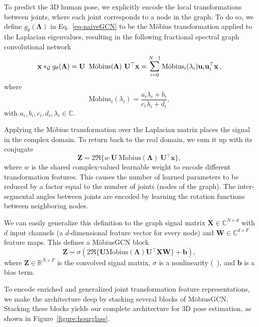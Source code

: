 \documentclass[runningheads]{llncs}
\newcommand{\bigsum}[3]{\mathlarger{\sum}_{#1 = #2}^{#3}}
\renewcommand{\vec}[1]{\ensuremath{\mathbf{#1}}}
\newcommand{\mat}[1]{\ensuremath{\mathbf{#1}}}
\newcommand{\mob}{\ensuremath{\operatorname{M\ddot{o}bius}}}
\newcommand{\graphconv}{\ensuremath{\ast_\mathcal{G}}}
\newcommand{\transpose}{\ensuremath{^\top}}
\begin{document}
To predict the 3D human pose, we explicitly encode the local transformations between joints, where each joint corresponds to a node in the graph. To do so, we define $g_{\theta}(\mat{\Lambda})$ in Eq.~\eqref{eq-naiveGCN} to be the M\"{o}bius transformation applied to the Laplacian eigenvalues, resulting in the following fractional spectral graph convolutional network
\begin{equation}
    \vec{x} \graphconv g_\theta(\mat{\Lambda}) = \mat{U}\  \mob(\mat{\Lambda})\ \mat{U}\transpose\vec{x} = \bigsum{i}{0}{N - 1} \mob_i(\lambda_i)\vec{u}_i\vec{u}_i\transpose\vec{x}\,,
    \label{mobgcn--better-use-of-latex}
\end{equation}
where 
\begin{equation}
\mob_i(\lambda_i) = \frac{a_i\lambda_i+b_i}{c_i\lambda_i+d_i},    
\end{equation}
 with $a_i, b_i, c_i, d_i, \lambda_i \in\mathbb{C}$.

Applying the M\"obius transformation over the Laplacian matrix places the signal in the complex domain. To return back to the real domain, we sum it up with its conjugate
\begin{equation}
    \mat{Z} = 2\Re \{w\ \mat{U}\ \mob (\mat{\Lambda})\ \mat{U}\transpose \vec{x}\},
    \label{realify}
\end{equation}
where $w$ is the shared complex-valued learnable weight to encode different transformation features. This causes the number of learned parameters to be reduced by a factor equal to the number of joints (nodes of the graph). The inter-segmental angles between joints are encoded by learning the rotation functions between neighboring nodes. 

We can easily generalize this definition to the graph signal matrix $\mathbf{X} \in \mathbb{C}^{N\times d}$ with $d$ input channels (\ie a $d$-dimensional feature vector for every node) and $\mathbf{W} \in \mathbb{C}^{d \times F}$ feature maps. 
This defines a M\"obiusGCN block
\begin{equation}
    \mat{Z} = \sigma(2\Re \{\mat{U} \mob(\mat{\Lambda})\mat{U}\transpose\mat{X}\mat{W}\} + \vec{b}),
\label{block}
\end{equation}
where $\mathbf{Z} \in \mathbb{R}^{N\times F}$ is the convolved signal matrix,
$\sigma$ is a nonlinearity  (\eg {}~\cite{nair2010rectified}), and $\vec{b}$ is a bias term.

To encode enriched and generalized joint transformation feature representations, we make the architecture deep by stacking several blocks of M\"obiusGCN. Stacking these blocks yields our complete architecture for 3D pose estimation, as shown in Figure~\ref{figure:hourglass}.
\end{document}
